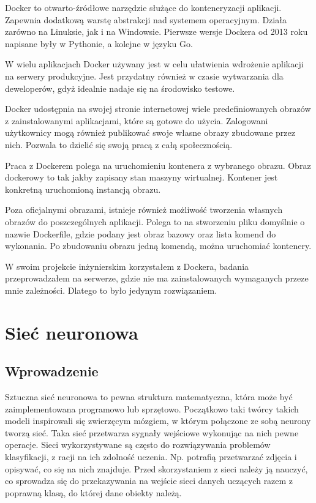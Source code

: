     Docker to otwarto-źródłowe narzędzie służące do konteneryzacji aplikacji.
    Zapewnia dodatkową warstę abstrakcji nad systemem operacyjnym.
    Działa zarówno na Linuksie, jak i na Windowsie.
    Pierwsze wersje Dockera od 2013 roku napisane były w Pythonie, a kolejne w języku Go.

    W wielu aplikacjach Docker używany jest w celu ułatwienia wdrożenie aplikacji na serwery produkcyjne.
    Jest przydatny również w czasie wytwarzania dla deweloperów, gdyż idealnie nadaje się na środowisko testowe.

    Docker udostępnia na swojej stronie internetowej wiele predefiniowanych obrazów z zainstalowanymi aplikacjami, które są gotowe do użycia.
    Zalogowani użytkownicy mogą również publikować swoje własne obrazy zbudowane przez nich.
    Pozwala to dzielić się swoją pracą z całą społecznością.

    Praca z Dockerem polega na uruchomieniu kontenera z wybranego obrazu.
    Obraz dockerowy to tak jakby zapisany stan maszyny wirtualnej.
    Kontener jest konkretną uruchomioną instancją obrazu.

    Poza oficjalnymi obrazami, istnieje również możliwość tworzenia własnych obrazów do poszczególnych aplikacji.
    Polega to na stworzeniu pliku domyślnie o nazwie Dockerfile, gdzie podany jest obraz bazowy oraz lista komend do wykonania.
    Po zbudowaniu obrazu jedną komendą, można uruchomiać kontenery.

    W swoim projekcie inżynierskim korzystałem z Dockera, badania przeprowadzałem na serwerze, gdzie nie ma zainstalowanych wymaganych przeze mnie zależności.
    Dlatego to było jedynym rozwiązaniem.


    \chapter{Sieć neuronowa}\label{ch:siećNeuronowa}

    \section{Wprowadzenie}\label{sec:wprowadzenie}

    Sztuczna sieć neuronowa to pewna struktura matematyczna, która może być zaimplementowana programowo lub sprzętowo.
    Początkowo taki twórcy takich modeli inspirowali się zwierzęcym mózgiem, w którym połączone ze sobą neurony tworzą sieć.
    Taka sieć przetwarza sygnały wejściowe wykonując na nich pewne operacje.
    Sieci wykorzystywane są często do rozwiązywania problemów klasyfikacji, z racji na ich zdolność uczenia.
    Np. potrafią przetwarzać zdjęcia i opisywać, co się na nich znajduje.
    Przed skorzystaniem z sieci należy ją nauczyć, co sprowadza się do przekazywania na wejście sieci danych uczących razem z poprawną klasą, do której dane obiekty należą.

